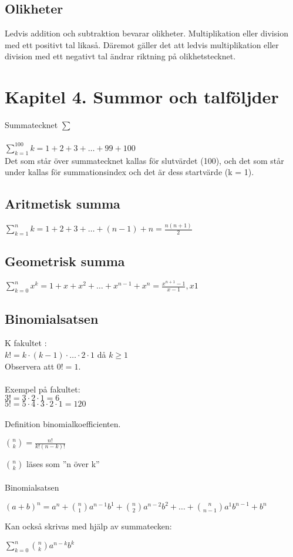 \documentclass[11pt]{article}
\begin{document}
\subsection{Olikheter}
Ledvis addition och subtraktion bevarar olikheter. Multiplikation eller division med ett positivt tal likaså. Däremot gäller det att ledvis multiplikation eller division med ett negativt tal ändrar riktning på olikhetstecknet. 

\section{Kapitel 4. Summor och talföljder}
Summatecknet $\sum$ \\ \\
$ \displaystyle\sum_{k=1}^{100} k = 1+2+3+ \ldots +99+100 $ \\
Det som står över summatecknet kallas för slutvärdet (100), och det som står under kallas för summationsindex och det är dess startvärde (k = 1). 
\subsection{Aritmetisk summa}
$\displaystyle\sum_{k=1}^{n} k = 1+2+3+\ldots+(n-1)+n = \frac{n(n+1)}{2}$
\subsection{Geometrisk summa}
$\displaystyle\sum_{k=0}^{n} x^k = 1+x+x^2+\ldots+x^{n-1}+x^n = \frac{x^{n+1}-1}{x-1}, x­1$
\subsection{Binomialsatsen}
K fakultet : \\
$k! = k \cdot (k-1) \cdot \ldots \cdot 2 \cdot 1 $ då $ k \geq 1 $ \\
Observera att $0! = 1$. \\ \\
Exempel på fakultet: \\
$3! = 3 \cdot 2 \cdot 1 = 6$ \\
$5! = 5 \cdot 4 \cdot 3 \cdot 2 \cdot 1 = 120$ \\ \\
Definition binomialkoefficienten. 
\begin{center}
${n\choose k} = \frac{n!}{k!(n-k)!}$ 
\end{center}
$n \choose k$ läses som ''n över k'' \\ \\
Binomialsatsen
\begin{center}
$(a+b)^n = a^n + {n \choose 1}a^{n-1}b^1 + {n \choose 2} a^{n-2}b^2 + \ldots + {n \choose n-1} a^1 b^{n-1} + b^n$
\end{center}
Kan också skrivas med hjälp av summatecken:
\begin{center}
$\displaystyle\sum_{k=0}^{n} {n \choose k} a^{n-k}b^k$
\end{center}
\end{document}
